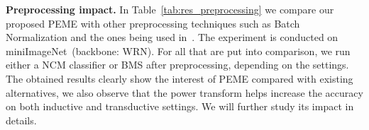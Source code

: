 \documentclass[review]{elsarticle}
\begin{document}
\textbf{Preprocessing impact.} In Table~\ref{tab:res_preprocessing} we compare our proposed PEME with other preprocessing techniques such as Batch Normalization and the ones being used in~\cite{DBLP:journals/corr/abs-1911-04623}. The experiment is conducted on miniImageNet~(backbone: WRN). For all that are put into comparison, we run either a NCM classifier or BMS after preprocessing, depending on the settings. The obtained results clearly show the interest of PEME compared with existing alternatives, we also observe that the power transform helps increase the accuracy on both inductive and transductive settings. We will further study its impact in details.

\begin{table}[h!]
    \caption{1-shot and 5-shot accuracy of proposed method on different backbones and benchmarks. Comparison with k-means algorithm.}
    \centering
    \label{tab:res_backbones}
\end{table}
\end{document}
